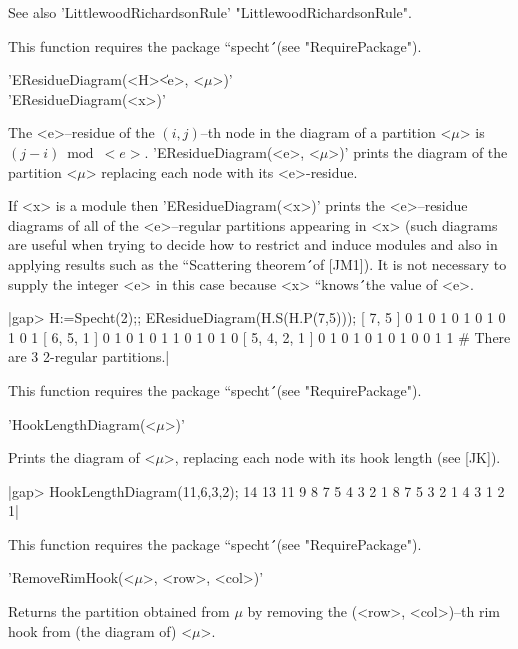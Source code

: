 See also 'LittlewoodRichardsonRule' "LittlewoodRichardsonRule".

This function requires the package ``specht\'\'\ (see "RequirePackage").



'EResidueDiagram(<H>\|<e>, <$\mu$>)'  \\
'EResidueDiagram(<x>)'

The <e>--residue of the $(i,j)$--th node in the diagram of a partition 
<$\mu$> is $(j-i)\bmod <e>$. 'EResidueDiagram(<e>, <$\mu$>)' prints the 
diagram of the partition <$\mu$> replacing each node with its <e>-residue.

If <x> is a module then 'EResidueDiagram(<x>)' prints the <e>--residue 
diagrams of all of the <e>--regular partitions appearing in <x> (such 
diagrams are useful when trying to decide how to restrict and induce 
modules and also in applying results such as the ``Scattering theorem\'\'\
of [JM1]). It is not necessary to supply the integer <e> in this case 
because <x> ``knows\'\'\ the value of <e>.

|gap> H:=Specht(2);; EResidueDiagram(H.S(H.P(7,5)));
[ 7, 5 ]
   0   1   0   1   0   1   0
   1   0   1   0   1
[ 6, 5, 1 ]
   0   1   0   1   0   1
   1   0   1   0   1
   0
[ 5, 4, 2, 1 ]
   0   1   0   1   0
   1   0   1   0
   0   1
   1
# There are 3 2-regular partitions.|

This function requires the package ``specht\'\'\ (see "RequirePackage").



'HookLengthDiagram(<$\mu$>)'

Prints the diagram of <$\mu$>, replacing each node with its hook length
(see [JK]).

|gap> HookLengthDiagram(11,6,3,2);
 14 13 11  9  8  7  5  4  3  2  1
  8  7  5  3  2  1
  4  3  1
  2  1|

This function requires the package ``specht\'\'\ (see "RequirePackage").



'RemoveRimHook(<$\mu$>, <row>, <col>)'

Returns the partition obtained from $\mu$ by removing the (<row>, <col>)--th
rim hook from (the diagram of) <$\mu$>.

